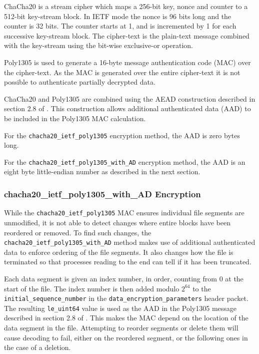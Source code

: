 \documentclass[10pt]{article}
\newcommand{\kw}[1]{\texttt{#1}}
\newcommand{\datatype}[1]{\kw{#1}}
\begin{document}
ChaCha20 is a stream cipher which maps a 256-bit key, nonce and counter to a 512-bit key-stream block.
In IETF mode the nonce is 96 bits long and the counter is 32 bits.
The counter starts at 1, and is incremented by 1 for each successive key-stream block.
The cipher-text is the plain-text message combined with the key-stream using the bit-wise exclusive-or operation.

Poly1305 is used to generate a 16-byte message authentication code (MAC) over the cipher-text.
As the MAC is generated over the entire cipher-text it is not possible to authenticate partially decrypted data.

ChaCha20 and Poly1305 are combined using the AEAD construction described in section 2.8 of \cite{RFC8439}.
This construction allows additional authenticated data (AAD) to be included in the Poly1305 MAC calculation.

For the \kw{chacha20\_ietf\_poly1305} encryption method,
the AAD is zero bytes long.

For the \kw{chacha20\_ietf\_poly1305\_with\_AD} encryption method,
the AAD is an eight byte little-endian number as described in the next section.

\subsubsection{chacha20\_ietf\_poly1305\_with\_AD Encryption}\label{data:AD_encrypting_mode}

While the \kw{chacha20\_ietf\_poly1305} MAC ensures individual file segments are unmodified,
it is not able to detect changes where entire blocks have been reordered or removed.
To find such changes, the \kw{chacha20\_ietf\_poly1305\_with\_AD} method makes
use of additional authenticated data to enforce ordering of the file segments.
It also changes how the file is terminated so that processes reading to the end
can tell if it has been truncated.

Each data segment is given an index number, in order,
counting from $0$ at the start of the file.
The index number is then added modulo $2^{64}$ to the \kw{initial\_sequence\_number}
in the \kw{data\_encryption\_parameters} header packet.
The resulting \datatype{le\_uint64} value is used as the AAD in the Poly1305
message described in section 2.8 of \cite{RFC8439}.
This makes the MAC depend on the location of the data segment in the file.
Attempting to reorder segments or delete them will cause decoding to fail,
either on the reordered segment,
or the following ones in the case of a deletion.
\end{document}
